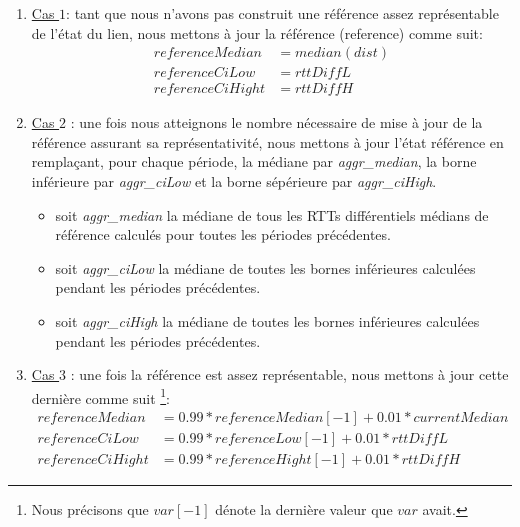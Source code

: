 \begin{itemize}
	\begin{enumerate}
		\item \underline{Cas $1$}: tant que nous n'avons pas construit une référence assez représentable de l'état du lien,  nous mettons à jour la référence ({\color{gray}reference}) comme suit: 
		\begin{align}
		referenceMedian &= median(dist)\\
		referenceCiLow &= rttDiffL\\
		referenceCiHight& = rttDiffH
		\end{align}
		\item \underline{Cas $2$} : une fois nous atteignons le nombre nécessaire de  mise à jour de la référence assurant sa représentativité, nous mettons à jour l'état référence en remplaçant, pour chaque période, la médiane par \textit{ aggr\_median}, la borne inférieure  par  \textit{aggr\_ciLow} et la borne sépérieure par \textit{aggr\_ciHigh}.
		\begin{itemize}
			
			\item  soit \textit{aggr\_median} la médiane de tous les RTTs différentiels médians de référence calculés pour toutes les périodes précédentes. 
			
			\item 	soit \textit{aggr\_ciLow} la médiane de     toutes les bornes inférieures calculées pendant les périodes précédentes.
			
			\item 	soit \textit{aggr\_ciHigh} la médiane de     toutes les bornes inférieures calculées pendant les périodes précédentes.
			
		\end{itemize}
		
		
		\item \underline{Cas $3$} : une fois la référence est assez représentable, nous mettons à jour cette dernière comme suit \footnote{Nous précisons que $ var[-1] $ dénote la dernière valeur que $ var $  avait. }:
\begin{align*}
referenceMedian &=  0.99*referenceMedian[-1]+0.01*currentMedian\\
referenceCiLow &=	 0.99*referenceLow[-1]+0.01*rttDiffL\\
referenceCiHight &=  0.99*referenceHight[-1]+0.01*rttDiffH
\end{align*}
		
		
		

\end{enumerate}
\end{itemize}
